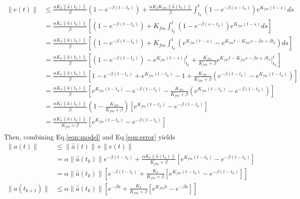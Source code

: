 \documentclass{article}
\begin{document}
\begin{equation}\label{eqn:error}
	\begin{aligned}
		\|e(t)\| &\leq \frac{\alpha K_{\delta}\|\hat{a}(t_k)\|}{\beta}(1 - e^{-\beta(t - t_k)}) + \frac{\alpha K_{\delta}K_{fm}\|\hat{a}(t_k)\|}{\beta}\int_{t_k}^t(1 - e^{-\beta(s - t_k)})e^{K_{fm}(t-s)}ds\\
				 &= \frac{\alpha K_{\delta}\|\hat{a}(t_k)\|}{\beta}\left[(1 - e^{-\beta(t - t_k)}) + K_{fm}\int_{t_k}^t(1 - e^{-\beta(s - t_k)})e^{K_{fm}(t-s)}ds\right]\\
				 &= \frac{\alpha K_{\delta}\|\hat{a}(t_k)\|}{\beta}\left[(1 - e^{-\beta(t - t_k)}) + K_{fm}\int_{t_k}^t(e^{K_{fm}(t-s)} - e^{K_{fm}t-K_{fm}s - \beta s + \beta t_k})ds\right]\\
				 &= \frac{\alpha K_{\delta}\|\hat{a}(t_k)\|}{\beta}\left[(1 - e^{-\beta(t - t_k)}) - e^{K_{fm}(t-s)}\bigg|_{t_k}^t + \frac{K_{fm}}{K_{fm} + \beta} e^{K_{fm}t - K_{fm}s - \beta s + \beta t_k}\bigg|_{t_k}^t\right]\\
				 &= \frac{\alpha K_{\delta}\|\hat{a}(t_k)\|}{\beta}\left[1 - e^{-\beta(t - t_k)} + e^{K_{fm}(t-t_k)} - 1 + \frac{K_{fm}}{K_{fm} + \beta} (e^{- \beta(t - t_k)} - e^{K_{fm}(t-t_k)})\right]\\
				 &= \frac{\alpha K_{\delta}\|\hat{a}(t_k)\|}{\beta}\left[e^{K_{fm}(t-t_k)} - e^{-\beta(t - t_k)} - \frac{K_{fm}}{K_{fm} + \beta}\left(e^{K_{fm}(t-t_k)} - e^{-\beta(t - t_k)}\right)\right]\\
				 &= \frac{\alpha K_{\delta}\|\hat{a}(t_k)\|}{\beta}\left(1 - \frac{K_{fm}}{K_{fm} + \beta}\right)[e^{K_{fm}(t-t_k)} - e^{-\beta(t - t_k)}]\\
				 &= \frac{\alpha K_{\delta}\|\hat{a}(t_k)\|}{K_{fm} + \beta}[e^{K_{fm}(t-t_k)} - e^{-\beta(t - t_k)}]\\
	\end{aligned}
\end{equation}
Then, combining Eq.\ref{eqn:model} and Eq.\ref{eqn:error} yields
\begin{equation}
	\begin{aligned}
		\|a(t)\| &\leq \|\hat{a}(t)\| + \|e(t)\|\\
				 &= \alpha\|\hat{a}(t_k)\|e^{-\beta(t - t_k)} + \frac{\alpha K_{\delta}\|\hat{a}(t_k)\|}{K_{fm} + \beta}[e^{K_{fm}(t-t_k)} - e^{-\beta(t - t_k)}]\\
				 &= \alpha\|\hat{a}(t_k)\|\left[e^{-\beta(t - t_k)} + \frac{K_{\delta}}{K_{fm} + \beta}[e^{K_{fm}(t-t_k)} - e^{-\beta(t - t_k)}]\right]\\
		\|a(t_{k+1})\| &\leq \alpha\|\hat{a}(t_k)\|\left[e^{-\beta h} + \frac{K_{\delta}}{K_{fm} + \beta}[e^{K_{fm}h} - e^{-\beta h}]\right]\\
	\end{aligned}
\end{equation}
\end{document}
